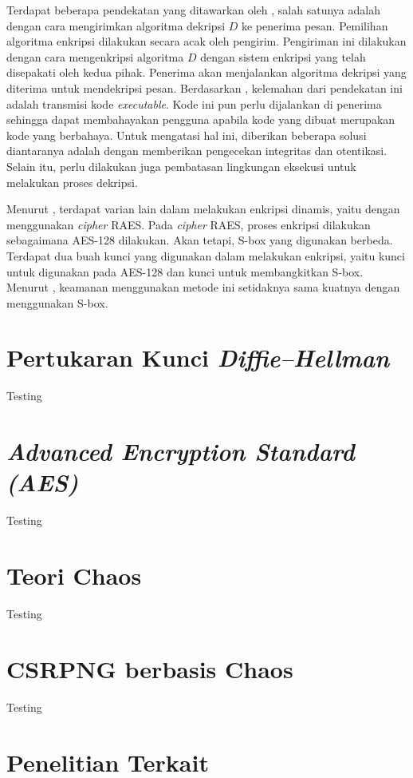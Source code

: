 Terdapat beberapa pendekatan yang ditawarkan oleh \textcite{knudsen2015}, salah satunya adalah dengan cara mengirimkan algoritma dekripsi $D$ ke penerima pesan. Pemilihan algoritma enkripsi dilakukan secara acak oleh pengirim. Pengiriman ini dilakukan dengan cara mengenkripsi algoritma $D$ dengan sistem enkripsi yang telah disepakati oleh kedua pihak. Penerima akan menjalankan algoritma dekripsi yang diterima untuk mendekripsi pesan. Berdasarkan \textcite{knudsen2015}, kelemahan dari pendekatan ini adalah transmisi kode \emph{executable}. Kode ini pun perlu dijalankan di penerima sehingga dapat membahayakan pengguna apabila kode yang dibuat merupakan kode yang berbahaya. Untuk mengatasi hal ini, diberikan beberapa solusi diantaranya adalah dengan memberikan pengecekan integritas dan otentikasi. Selain itu, perlu dilakukan juga pembatasan lingkungan eksekusi untuk melakukan proses dekripsi.

Menurut \textcite{knudsen2015}, terdapat varian lain dalam melakukan enkripsi dinamis, yaitu dengan menggunakan \emph{cipher} RAES. Pada \emph{cipher} RAES, proses enkripsi dilakukan sebagaimana AES-128 dilakukan. Akan tetapi, S-box yang digunakan berbeda. Terdapat dua buah kunci yang digunakan dalam melakukan enkripsi, yaitu kunci untuk digunakan pada AES-128 dan kunci untuk membangkitkan S-box. Menurut \textcite{knudsen2015}, keamanan menggunakan metode ini setidaknya sama kuatnya dengan menggunakan S-box.

\section{Pertukaran Kunci \emph{Diffie–Hellman}}
Testing

\section{\emph{Advanced Encryption Standard (AES)}}
Testing

\section{Teori Chaos}
Testing

\section{CSRPNG berbasis Chaos}
Testing

\section{Penelitian Terkait}

